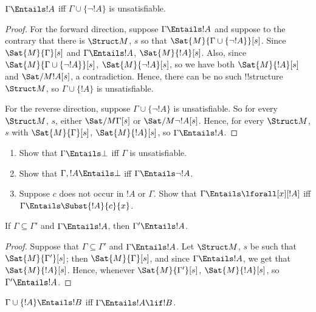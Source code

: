 \documentclass[../../../include/open-logic-section]{subfiles}
\begin{document}
\begin{prop}
$\Gamma \Entails !A$ iff $\Gamma \cup \{\lnot !A\}$ is unsatisfiable.
\end{prop}

\begin{proof}
For the forward direction, suppose $\Gamma \Entails !A$ and suppose to the 
contrary that there is $\Struct M$, $s$ so that $\Sat{M}{\Gamma   \cup \{ 
\lnot !A \}}[s]$. Since $\Sat{M}{\Gamma}[s]$ and $\Gamma \Entails !A$, $\Sat{M
}{!A}[s]$. Also, since $\Sat{M}{\Gamma\cup \{ \lnot !A \}}[s]$, $\Sat{M}{\lnot
 !A}[s]$, so we have both $\Sat{M}{!A}[s]$ and $\Sat/{M}{!A}[s]$, a 
contradiction. Hence, there can be no such !!{structure} $\Struct M$, so $
\Gamma \cup \{ !A \}$ is unsatisfiable.

For the reverse direction, suppose $\Gamma \cup \{ \lnot !A \}$ is 
unsatisfiable. So for every $\Struct M$, $s$, either $\Sat/{M}{\Gamma}[s]$ or 
$\Sat/{M}{\lnot !A}[s]$. Hence, for every $\Struct M$, $s$ with $\Sat{M}{
\Gamma}[s]$, $\Sat{M}{!A}[s]$, so $\Gamma \Entails !A$.
\end{proof}

\begin{prob}
\begin{enumerate}
\item Show that $\Gamma \Entails \bot$ iff $\Gamma$ is unsatisfiable.
\item Show that $\Gamma, !A \Entails \bot$ iff $\Gamma \Entails \lnot !A$.
\item Suppose $c$ does not occur in $!A$ or $\Gamma$.  Show that
  $\Gamma \Entails \lforall[x][!A]$ iff $\Gamma \Entails
  \Subst{!A}{c}{x}$.
\end{enumerate}
\end{prob}


\begin{prop}
If $\Gamma \subseteq \Gamma'$ and $\Gamma \Entails !A$, then $\Gamma'
\Entails !A$.
\end{prop}

\begin{proof}
Suppose that $\Gamma \subseteq \Gamma'$ and $\Gamma \Entails !A$. Let $\Struct
  M$, $s$ be such that $\Sat{M}{\Gamma'}[s]$; then $\Sat{M}{\Gamma}[s]$, and 
since $\Gamma \Entails !A$, we get that $\Sat{M}{!A}[s]$. Hence, whenever $
\Sat{M}{\Gamma'}[s]$, $\Sat{M}{!A}[s]$, so $\Gamma' \Entails !A$.
\end{proof}


\begin{thm}
$\Gamma \cup \{!A\} \Entails !B$ iff $\Gamma \Entails !A \lif !B$.
\end{thm}
\end{document}
